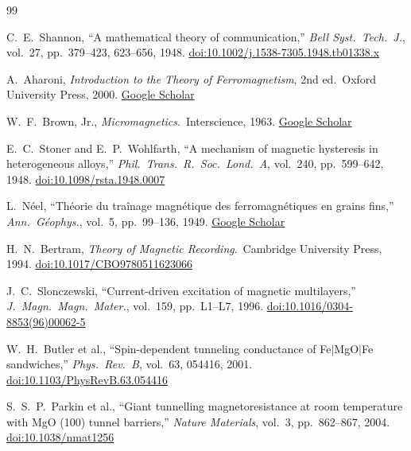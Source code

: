 \documentclass[11pt,a4paper,openany]{book}
\theoremstyle{definition}
\theoremstyle{plain}
\theoremstyle{remark}
\begin{document}
\begin{thebibliography}{99}

C.~E.~Shannon, ``A mathematical theory of communication,''
\textit{Bell Syst.\ Tech.\ J.}, vol.\ 27, pp.\ 379--423, 623--656, 1948.
\href{https://doi.org/10.1002/j.1538-7305.1948.tb01338.x}{doi:10.1002/j.1538-7305.1948.tb01338.x}

A.~Aharoni, \textit{Introduction to the Theory of Ferromagnetism}, 2nd ed.\
Oxford University Press, 2000.
\href{https://scholar.google.com/scholar?q=Introduction+to+the+Theory+of+Ferromagnetism+Aharoni}{Google Scholar}

W.~F.~Brown, Jr., \textit{Micromagnetics}.\ Interscience, 1963.
\href{https://scholar.google.com/scholar?q=Micromagnetics+Brown+1963}{Google Scholar}

E.~C.~Stoner and E.~P.~Wohlfarth, ``A mechanism of magnetic hysteresis
in heterogeneous alloys,''
\textit{Phil.\ Trans.\ R.\ Soc.\ Lond.\ A}, vol.\ 240, pp.\ 599--642, 1948.
\href{https://doi.org/10.1098/rsta.1948.0007}{doi:10.1098/rsta.1948.0007}

L.~N\'{e}el, ``Th\'{e}orie du tra\^{i}nage magn\'{e}tique des
ferromagn\'{e}tiques en grains fins,''
\textit{Ann.\ G\'{e}ophys.}, vol.\ 5, pp.\ 99--136, 1949.
\href{https://scholar.google.com/scholar?q=Neel+trainage+magnetique+ferromagnetiques+grains+fins+1949}{Google Scholar}

H.~N.~Bertram, \textit{Theory of Magnetic Recording}.\
Cambridge University Press, 1994.
\href{https://doi.org/10.1017/CBO9780511623066}{doi:10.1017/CBO9780511623066}

\bibitem{slonczewski96}
J.~C.~Slonczewski, ``Current-driven excitation of magnetic multilayers,''
\textit{J.\ Magn.\ Magn.\ Mater.}, vol.\ 159, pp.\ L1--L7, 1996.
\href{https://doi.org/10.1016/0304-8853(96)00062-5}{doi:10.1016/0304-8853(96)00062-5}

\bibitem{butler01}
W.~H.~Butler et al., ``Spin-dependent tunneling conductance of
Fe$|$MgO$|$Fe sandwiches,''
\textit{Phys.\ Rev.\ B}, vol.\ 63, 054416, 2001.
\href{https://doi.org/10.1103/PhysRevB.63.054416}{doi:10.1103/PhysRevB.63.054416}

\bibitem{parkin04}
S.~S.~P.~Parkin et al., ``Giant tunnelling magnetoresistance at room
temperature with MgO (100) tunnel barriers,''
\textit{Nature Materials}, vol.\ 3, pp.\ 862--867, 2004.
\href{https://doi.org/10.1038/nmat1256}{doi:10.1038/nmat1256}


\end{thebibliography}
\end{document}
